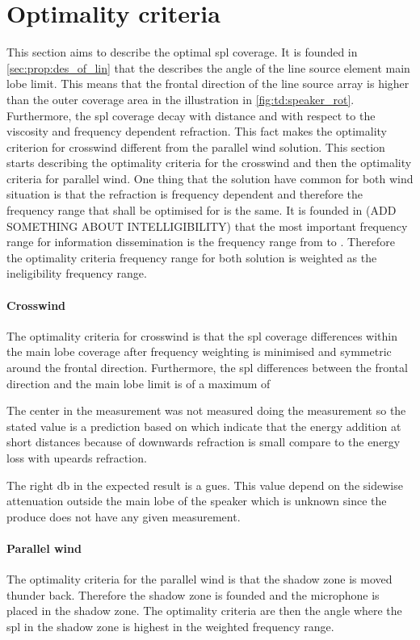 \section{Optimality criteria}
This section aims to describe the optimal \gls{spl} coverage. It is founded in \autoref{sec:prop:des_of_lin} that the  describes the angle of the line source element main lobe limit. This means that the frontal direction of the line source array is  higher than the outer coverage area in the illustration in \autoref{fig:td:speaker_rot}. Furthermore, the \gls{spl} coverage decay with distance and with respect to the viscosity and frequency dependent refraction. This fact makes the optimality criterion for crosswind different from the parallel wind solution. This section starts describing the optimality criteria for the crosswind and then the optimality criteria for parallel wind. One thing that the solution have common for both wind situation is that the refraction is frequency dependent and therefore the frequency range that shall be optimised for is the same. It is founded in (ADD SOMETHING ABOUT INTELLIGIBILITY) that the most important frequency range for information dissemination is the frequency range from  to . Therefore the optimality criteria frequency range for both solution is weighted as the ineligibility frequency range. 


\paragraph{Crosswind} The optimality criteria for crosswind is that the \gls{spl} coverage differences within the main lobe coverage after frequency weighting is minimised and symmetric around the frontal direction. Furthermore, the \gls{spl} differences between the frontal direction and the main lobe limit is of a maximum of 



The center in the measurement was not measured doing the measurement so the stated value is a prediction based on \citep{review_of_sound} which indicate that the energy addition at short distances because of downwards refraction is small compare to the energy loss with upeards refraction. 

The right \si{\decibel} in the expected result is a gues. This value depend on the sidewise attenuation outside the main lobe of the speaker which is unknown since the produce does not have any given measurement.




\paragraph{Parallel wind} The optimality criteria for the parallel wind is that the shadow zone is moved thunder back. Therefore the shadow zone is founded and the microphone is placed in the shadow zone. The optimality criteria are then the angle where the \gls{spl} in the shadow zone is highest in the weighted frequency range. 
